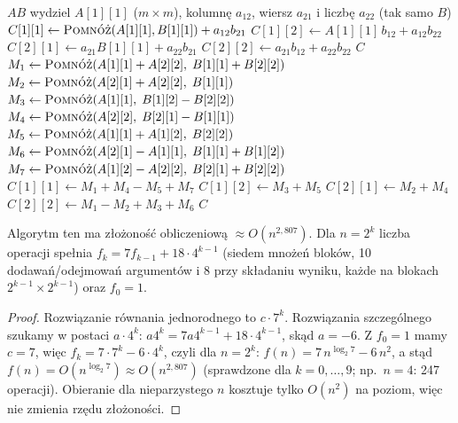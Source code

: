 \documentclass[11pt,a4paper]{article}
\newcommand{\Pomnoz}{\textsc{Pomnóż}}
\begin{document}
\begin{algorithm}[H]
\caption{Rekurencyjne mnożenie macierzy metodą Strassena}
\begin{algorithmic}[1]
\Procedure{\Pomnoz}{$A, B$} 
    \State \Return $AB$
  \EndIf
   
    \State wydziel $A[1][1]$ ($m{\times}m$), kolumnę $a_{12}$, wiersz $a_{21}$ i liczbę $a_{22}$ (tak samo $B$)
    \State $C[1][1] \gets \Pomnoz(A[1][1],B[1][1]) + a_{12}b_{21}$
    \State $C[1][2] \gets A[1][1]\,b_{12} + a_{12}b_{22}$
    \State $C[2][1] \gets a_{21}B[1][1] + a_{22}b_{21}$
    \State $C[2][2] \gets a_{21}b_{12} + a_{22}b_{22}$
    \State \Return $C$
  \EndIf
  \State $M_1 \gets \Pomnoz(A[1][1] + A[2][2],\; B[1][1] + B[2][2])$
  \State $M_2 \gets \Pomnoz(A[2][1] + A[2][2],\; B[1][1])$
  \State $M_3 \gets \Pomnoz(A[1][1],\; B[1][2] - B[2][2])$
  \State $M_4 \gets \Pomnoz(A[2][2],\; B[2][1] - B[1][1])$
  \State $M_5 \gets \Pomnoz(A[1][1] + A[1][2],\; B[2][2])$
  \State $M_6 \gets \Pomnoz(A[2][1] - A[1][1],\; B[1][1] + B[1][2])$
  \State $M_7 \gets \Pomnoz(A[1][2] - A[2][2],\; B[2][1] + B[2][2])$
  \State $C[1][1] \gets M_1 + M_4 - M_5 + M_7$
  \State $C[1][2] \gets M_3 + M_5$
  \State $C[2][1] \gets M_2 + M_4$
  \State $C[2][2] \gets M_1 - M_2 + M_3 + M_6$
  \State \Return $C$
\EndProcedure
\end{algorithmic}
\end{algorithm}

Algorytm ten ma złożoność obliczeniową $\approx O(n^{2{,}807})$. Dla $n=2^k$ liczba operacji spełnia
$f_k=7f_{k-1}+18\cdot4^{k-1}$ (siedem mnożeń bloków, 10 dodawań/odejmowań argumentów i 8 przy składaniu wyniku,
każde na blokach $2^{k-1}\times2^{k-1}$) oraz $f_0=1$.

\begin{proof}
Rozwiązanie równania jednorodnego to $c\cdot7^k$. Rozwiązania szczególnego szukamy w postaci $a\cdot4^k$:
$a4^k=7a4^{k-1}+18\cdot4^{k-1}$, skąd $a=-6$. Z $f_0=1$ mamy $c=7$, więc $f_k=7\cdot7^k-6\cdot4^k$,
czyli dla $n=2^k$: $f(n)=7\,n^{\log_2 7}-6\,n^2$, a stąd $f(n)=O(n^{\log_2 7})\approx O(n^{2{,}807})$
(sprawdzone dla $k=0,\dots,9$; np.\ $n=4$: 247 operacji). Obieranie dla nieparzystego $n$ kosztuje tylko $O(n^2)$ na
poziom, więc nie zmienia rzędu złożoności.
\end{proof}
\end{document}
